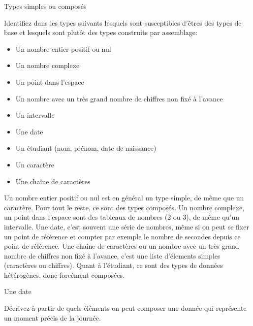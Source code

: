 \begin{exercice}
  \begin{exercicelet}{Types simples ou composés}
    \begin{questions}
    \item Identifiez dans les types suivants lesquels sont susceptibles
      d'êtres des types de base et lesquels sont plutôt des types construits
      par assemblage:
      \begin{itemize}
      \item Un nombre entier positif ou nul
      \item Un nombre complexe
      \item Un point dans l'espace
      \item Un nombre avec un très grand nombre de chiffres non fixé à
        l'avance
      \item Un intervalle
      \item Une date
      \item Un étudiant (nom, prénom, date de naissance)
      \item Un caractère
      \item Une chaîne de caractères
      \end{itemize}
      \begin{xcorrection}
        Un nombre entier positif ou nul est en général un type simple, de même
        que un caractère. Pour tout le reste, ce sont des types composés. Un
        nombre complexe, un point dans l'espace sont des tableaux de nombres
        (2 ou 3), de même qu'un intervalle. Une date, c'est souvent une série
        de nombres, même si on peut se fixer un point de référence et compter
        par exemple le nombre de secondes depuis ce point de référence. Une
        chaîne de caractères ou un nombre avec un très grand nombre de
        chiffres non fixé à l'avance, c'est une liste d'élements simples
        (caractères ou chiffres). Quant à l'étudiant, ce sont des types de
        données hétérogènes, donc forcément composées.
      \end{xcorrection}
    \end{questions}
  \end{exercicelet}
  \begin{exercicelet}{Une date}
    \begin{questions}
    \item Décrivez à partir de quels éléments on peut composer une donnée qui
      représente un moment précis de la journée.
      \begin{correction}

\end{correction}
\end{questions}
\end{exercicelet}
\end{exercice}
